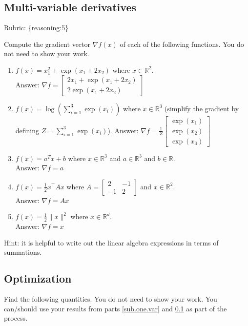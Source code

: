\documentclass{article}
\def\rubric#1{\gre{Rubric: \{#1\}}}{}
\def\blu#1{{\color{blu}#1}}
\def\gre#1{{\color{gre}#1}}
\def\norm#1{\|#1\|}
\def\R{\mathbb{R}}
\def\half{\frac 1 2}
\def\ans#1{\gre{Answer: #1}}{}
\begin{document}
\subsection{Multi-variable derivatives}
\label{sub.multi.var}
\rubric{reasoning:5}

\blu{Compute the gradient vector $\nabla f(x)$ of each of the following functions.} You do not need to show your work.
\begin{enumerate}
\item $f(x) = x_1^2 + \exp(x_1 + 2x_2)$ where $x \in \R^2$. \\
\ans{$\nabla f = \left[\begin{array}{c}
	2x_1 + \exp(x_1 + 2 x_2) \\ 2 \exp(x_1 + 2 x_2)
	\end{array}\right]$}
\item $f(x) = \log\left(\sum_{i=1}^3\exp(x_i)\right)$ where $x \in \R^3$ (simplify the gradient by defining $Z = \sum_{i=1}^3\exp(x_i)$).
\ans{$\nabla f = \frac{1}{Z}\left[\begin{array}{c}
	\exp(x_1) \\ \exp(x_2) \\ \exp(x_3)
	\end{array}\right]$}
\item $f(x) = a^Tx + b$ where $x \in \R^3$ and $a \in \R^3$ and $b \in \R$. \\
\ans{$\nabla f = a$}
\item $f(x) = \half x^\top A x$ where $A=\left[ \begin{array}{cc}
2 & -1 \\
 -1 & 2 \end{array} \right]$ and $x \in \mathbb{R}^2$. \\
\ans{$\nabla f = Ax$} 
\item $f(x) = \frac{1}{2}\norm{x}^2$ where $x \in \R^d$. \\
\ans{$\nabla f = x$}
\end{enumerate}

Hint: it is helpful to write out the linear algebra expressions in terms of summations.


\subsection{Optimization}
\blu{Find the following quantities.} You do not need to show your work. 
You can/should use your results from parts \ref{sub.one.var} and \ref{sub.multi.var} as part of the process.
\end{document}
